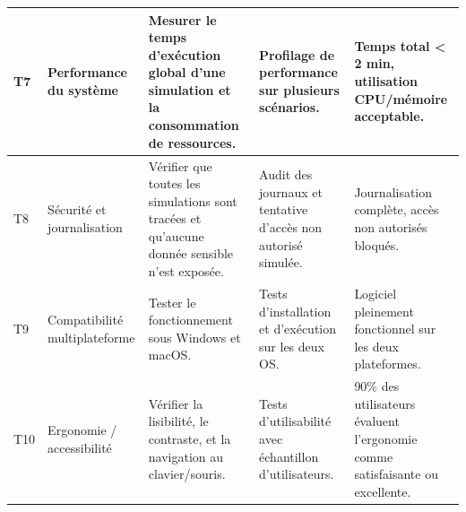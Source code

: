 \documentclass[11pt]{article}
\begin{document}
\begin{table}[h!]
\begin{tabular}{|p{1cm}|p{4cm}|p{5cm}|p{3cm}|p{3cm}|}
\hline
T7 & Performance du système & Mesurer le temps d’exécution global d’une simulation et la consommation de ressources. & Profilage de performance sur plusieurs scénarios. & Temps total < 2 min, utilisation CPU/mémoire acceptable. \\
\hline
T8 & Sécurité et journalisation & Vérifier que toutes les simulations sont tracées et qu’aucune donnée sensible n’est exposée. & Audit des journaux et tentative d’accès non autorisé simulée. & Journalisation complète, accès non autorisés bloqués. \\
\hline
T9 & Compatibilité multiplateforme & Tester le fonctionnement sous Windows et macOS. & Tests d’installation et d’exécution sur les deux OS. & Logiciel pleinement fonctionnel sur les deux plateformes. \\
\hline
T10 & Ergonomie / accessibilité & Vérifier la lisibilité, le contraste, et la navigation au clavier/souris. & Tests d’utilisabilité avec échantillon d’utilisateurs. & 90\% des utilisateurs évaluent l’ergonomie comme satisfaisante ou excellente. \\
\hline
\end{tabular}
\end{table}
\end{document}
